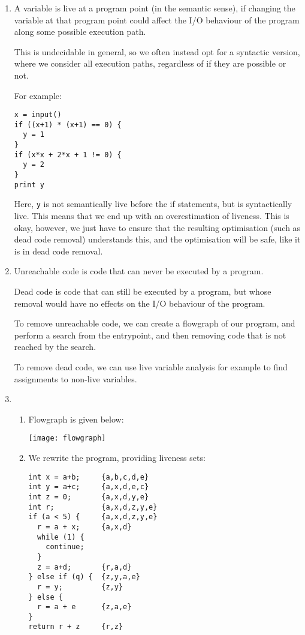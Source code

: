 


\begin{enumerate}[label=(\alph*)]
  \item
    A variable is live at a program point (in the semantic sense), if changing the variable at that program point could affect the I/O behaviour of the program along some possible execution path.

    This is undecidable in general, so we often instead opt for a syntactic version, where we consider all execution paths, regardless of if they are possible or not.

    For example:

\begin{verbatim}
x = input()
if ((x+1) * (x+1) == 0) {
  y = 1
}
if (x*x + 2*x + 1 != 0) {
  y = 2
}
print y
\end{verbatim}

Here, \texttt{y} is not semantically live before the if statements, but is syntactically live. This means that we end up with an overestimation of liveness. This is okay, however, we just have to ensure that the resulting optimisation (such as dead code removal) understands this, and the optimisation will be safe, like it is in dead code removal.

\item
  Unreachable code is code that can never be executed by a program.

  Dead code is code that can still be executed by a program, but whose removal would have no effects on the I/O behaviour of the program.

  To remove unreachable code, we can create a flowgraph of our program, and perform a search from the entrypoint, and then removing code that is not reached by the search.

  To remove dead code, we can use live variable analysis for example to find assignments to non-live variables.

\item
  \begin{enumerate}[label=(\roman*)]
    \item
      Flowgraph is given below:

      \texttt{[image: flowgraph]}

    \item
      We rewrite the program, providing liveness sets:

\begin{verbatim}
int x = a+b;     {a,b,c,d,e}
int y = a+c;     {a,x,d,e,c}
int z = 0;       {a,x,d,y,e}
int r;           {a,x,d,z,y,e}
if (a < 5) {     {a,x,d,z,y,e}
  r = a + x;     {a,x,d}
  while (1) {
    continue;
  }
  z = a+d;       {r,a,d}
} else if (q) {  {z,y,a,e}
  r = y;         {z,y}
} else {
  r = a + e      {z,a,e}
} 
return r + z     {r,z}


\end{verbatim}
\end{enumerate}
\end{enumerate}
